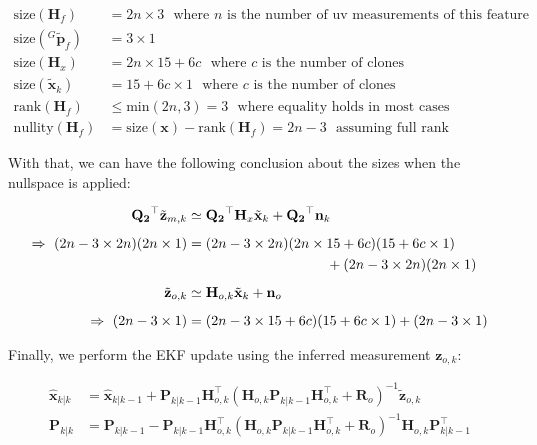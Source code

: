 \begin{align*} \textrm{size}(\mathbf{H}_{f}) &= 2n\times3 \textrm{~~where~}n\textrm{~is the number of uv measurements of this feature} \\[5px] \textrm{size}({}^G\tilde{\mathbf{p}}_f) &= 3\times1 \\[5px] \textrm{size}(\mathbf{H}_{x}) &= 2n\times15+6c \textrm{~~where~}c\textrm{~is the number of clones} \\[5px] \textrm{size}(\tilde{\mathbf{x}}_{k}) &= 15+6c\times1 \textrm{~~where~}c\textrm{~is the number of clones} \\[5px] \textrm{rank}(\mathbf{H}_{f}) &\leq \textrm{min}(2n,3) = 3 \textrm{~~where equality holds in most cases} \\[5px] \textrm{nullity}(\mathbf{H}_{f}) &= \textrm{size}(\mathbf{x}) - \textrm{rank}(\mathbf{H}_{f}) = 2n-3 \textrm{~~assuming full rank} \end{align*}

With that, we can have the following conclusion about the sizes when the nullspace is applied\+:

\begin{align*} \mathbf{Q_2}^\top\tilde{\mathbf{z}}_{m,k} &\simeq \mathbf{Q_2}^\top\mathbf{H}_{x} \tilde{\mathbf{x}}_{k} + \mathbf{Q_2}^\top\mathbf{n}_k \\[5px] \empty \Rightarrow~ (2n-3\times2n)(2n\times1) &= (2n-3\times2n)(2n\times15+6c)(15+6c\times1) \\ &\hspace{3.5cm}+ (2n-3\times2n)(2n\times1) \nonumber\\[5px] \empty \tilde{\mathbf{z}}_{o,k} &\simeq \mathbf{H}_{o,k}\tilde{\mathbf{x}}_{k} + \mathbf{n}_o \\[5px] \empty \Rightarrow~ (2n-3\times1) &= (2n-3\times15+6c)(15+6c\times1) + (2n-3\times1) \end{align*}

Finally, we perform the E\+KF update using the inferred measurement $\mathbf z_{o,k}$\+:

\begin{align*} \hat{\mathbf{x}}_{k|k} &= \hat{\mathbf{x}}_{k|k-1} + \mathbf{P}_{k|k-1} \mathbf{H}_{o,k}^\top (\mathbf{H}_{o,k} \mathbf{P}_{k|k-1} \mathbf{H}_{o,k}^\top + \mathbf{R}_o)^{-1}\tilde{\mathbf{z}}_{o,k} \\[5px] \mathbf{P}_{k|k} &= \mathbf{P}_{k|k-1} - \mathbf{P}_{k|k-1}\mathbf{H}_{o,k}^\top (\mathbf{H}_{o,k} \mathbf{P}_{k|k-1} \mathbf{H}_{o,k}^\top + \mathbf{R}_o)^{-1} \mathbf{H}_{o,k}\mathbf{P}_{k|k-1}^\top \end{align*}

